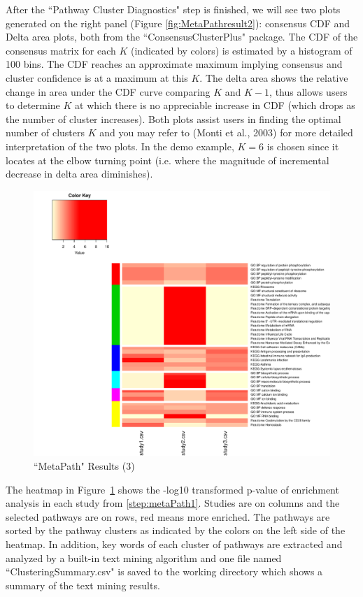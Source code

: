 After the ``Pathway Cluster Diagnostics" step is finished, we will see two plots generated on the right panel (Figure \ref{fig:MetaPathresult2}): consensus CDF and Delta area plots, both from the ``ConsensusClusterPlus" package. The CDF of the consensus matrix for each $K$ (indicated by colors) is estimated by a histogram of 100 bins. The CDF
reaches an approximate maximum implying consensus and cluster confidence is at a maximum at this $K$. The delta area shows the relative change in area under the CDF curve comparing $K$ and $K - 1$, thus allows users to determine $K$ at which there is no appreciable increase in CDF (which drops as the number of cluster increases). Both plots assist users in finding the optimal number of clusters $K$ and you may refer to (Monti et al., 2003) for more detailed interpretation of the two plots. 
In the demo example, $K=6$ is chosen since it locates at the elbow turning point (i.e. where the magnitude of incremental decrease in delta area diminishes).

\begin{figure}[H]
\begin{center}
\includegraphics[scale=0.6]{./figure/metaPath/Heatmap_clusters_all.pdf}
\caption{``MetaPath" Results (3)}
\label{fig:MetaPathresult3}
\end{center}
\end{figure}


The heatmap in Figure~\ref{fig:MetaPathresult3} shows the -log10 transformed p-value of enrichment analysis in each study from \ref{step:metaPath1}. 
Studies are on columns and the selected pathways are on rows, red means more enriched. The pathways are sorted by the pathway clusters as indicated by the colors on the left side of the heatmap. 
In addition, 
key words of each cluster of pathways are extracted and analyzed by a built-in text mining algorithm and one file named ``Clustering\textunderscore Summary.csv" is saved to the working directory which shows a summary of the text mining results. 



